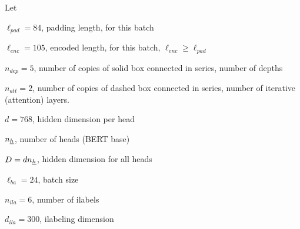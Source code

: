 \documentclass[12pt]{article}
\begin{document}
%
%
%



Let

$\ell_{pad}=84$, padding length, for this batch

$\ell_{enc}=105$, encoded length, for this batch, $\ell_{enc}\geq \ell_{pad}$

$n_{dep}=5$, number of copies of solid box connected in series, number of depths

 $n_{att}=2$, number of copies of
dashed box connected in series, number of iterative (attention) layers.


$d=768$, hidden dimension per head

$n_{\underline{h}}$, number of heads (BERT base)

$D=d n_{\underline{h}}$, hidden dimension
for all heads


$\ell_{ba}=24$, batch size

$n_{ila}=6$, number of ilabels

$d_{ila}=300$, ilabeling dimension
\end{document}
